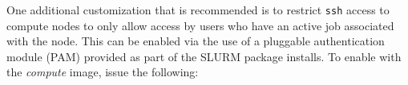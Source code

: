 One additional customization that is recommended is to restrict \texttt{ssh} access to
compute nodes to only allow access by users who have an
active job associated with the node. This can be enabled via the use of a
pluggable authentication module (PAM) provided as part of the SLURM package
installs. To enable with the {\em compute} image, issue the following:


